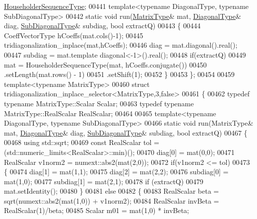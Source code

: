 \begin{DoxyCode}
       \hyperlink{group___householder___module_class_eigen_1_1_householder_sequence}{HouseholderSequenceType};
00441   \textcolor{keyword}{template}<\textcolor{keyword}{typename} DiagonalType, \textcolor{keyword}{typename} SubDiagonalType>
00442   \textcolor{keyword}{static} \textcolor{keywordtype}{void} run(\hyperlink{group___eigenvalues___module_add0f4b2216d0ea8ee0f7d8525deaf0a9}{MatrixType}& mat, \hyperlink{class_eigen_1_1internal_1_1_tensor_lazy_evaluator_writable}{DiagonalType}& diag, 
      \hyperlink{group___core___module_class_eigen_1_1_matrix}{SubDiagonalType}& subdiag, \textcolor{keywordtype}{bool} extractQ)
00443   \{
00444     CoeffVectorType hCoeffs(mat.cols()-1);
00445     tridiagonalization\_inplace(mat,hCoeffs);
00446     diag = mat.diagonal().real();
00447     subdiag = mat.template diagonal<-1>().real();
00448     \textcolor{keywordflow}{if}(extractQ)
00449       mat = HouseholderSequenceType(mat, hCoeffs.conjugate())
00450             .setLength(mat.rows() - 1)
00451             .setShift(1);
00452   \}
00453 \};
00454 
00459 \textcolor{keyword}{template}<\textcolor{keyword}{typename} MatrixType>
00460 \textcolor{keyword}{struct }tridiagonalization\_inplace\_selector<MatrixType,3,false>
00461 \{
00462   \textcolor{keyword}{typedef} \textcolor{keyword}{typename} MatrixType::Scalar Scalar;
00463   \textcolor{keyword}{typedef} \textcolor{keyword}{typename} MatrixType::RealScalar RealScalar;
00464 
00465   \textcolor{keyword}{template}<\textcolor{keyword}{typename} DiagonalType, \textcolor{keyword}{typename} SubDiagonalType>
00466   \textcolor{keyword}{static} \textcolor{keywordtype}{void} run(MatrixType& mat, \hyperlink{class_eigen_1_1internal_1_1_tensor_lazy_evaluator_writable}{DiagonalType}& diag, 
      \hyperlink{group___core___module_class_eigen_1_1_matrix}{SubDiagonalType}& subdiag, \textcolor{keywordtype}{bool} extractQ)
00467   \{
00468     \textcolor{keyword}{using} std::sqrt;
00469     \textcolor{keyword}{const} RealScalar tol = (std::numeric\_limits<RealScalar>::min)();
00470     diag[0] = mat(0,0);
00471     RealScalar v1norm2 = numext::abs2(mat(2,0));
00472     \textcolor{keywordflow}{if}(v1norm2 <= tol)
00473     \{
00474       diag[1] = mat(1,1);
00475       diag[2] = mat(2,2);
00476       subdiag[0] = mat(1,0);
00477       subdiag[1] = mat(2,1);
00478       \textcolor{keywordflow}{if} (extractQ)
00479         mat.setIdentity();
00480     \}
00481     \textcolor{keywordflow}{else}
00482     \{
00483       RealScalar beta = sqrt(numext::abs2(mat(1,0)) + v1norm2);
00484       RealScalar invBeta = RealScalar(1)/beta;
00485       Scalar m01 = mat(1,0) * invBeta;

\end{DoxyCode}
